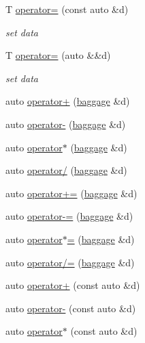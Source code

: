 \begin{DoxyCompactItemize}
T \hyperlink{classfractal_1_1baggage_aa196967bae7105ee4f7b2609557e3843}{operator=} (const auto \&d)
\begin{DoxyCompactList}\small\item\em set data \end{DoxyCompactList}\item 
T \hyperlink{classfractal_1_1baggage_a8904eb0c82e97fd1be2be7dbf9edf8a8}{operator=} (auto \&\&d)
\begin{DoxyCompactList}\small\item\em set data \end{DoxyCompactList}\item 
auto \hyperlink{classfractal_1_1baggage_a7e5735728eece548c425b12e45bb76ed}{operator+} (\hyperlink{classfractal_1_1baggage}{baggage} \&d)
\item 
auto \hyperlink{classfractal_1_1baggage_ae3e696df0f617540a076c098387c6df6}{operator-\/} (\hyperlink{classfractal_1_1baggage}{baggage} \&d)
\item 
auto \hyperlink{classfractal_1_1baggage_a65ff2c9d0b95c75913145564c916bb4e}{operator$\ast$} (\hyperlink{classfractal_1_1baggage}{baggage} \&d)
\item 
auto \hyperlink{classfractal_1_1baggage_a0011426532f94259bb3a737c26e4f9a8}{operator/} (\hyperlink{classfractal_1_1baggage}{baggage} \&d)
\item 
auto \hyperlink{classfractal_1_1baggage_a8a9085951c8eb400af15d2a9fd34e525}{operator+=} (\hyperlink{classfractal_1_1baggage}{baggage} \&d)
\item 
auto \hyperlink{classfractal_1_1baggage_a69180e126eca3a52976bf92dcf5fb998}{operator-\/=} (\hyperlink{classfractal_1_1baggage}{baggage} \&d)
\item 
auto \hyperlink{classfractal_1_1baggage_a4e874f81a01e3a13293163e4908eddf1}{operator$\ast$=} (\hyperlink{classfractal_1_1baggage}{baggage} \&d)
\item 
auto \hyperlink{classfractal_1_1baggage_a65c98b0f925e0c31d0d843a95aea5ffa}{operator/=} (\hyperlink{classfractal_1_1baggage}{baggage} \&d)
\item 
auto \hyperlink{classfractal_1_1baggage_a7a577be2bbc5619052bb8756c20ddb34}{operator+} (const auto \&d)
\item 
auto \hyperlink{classfractal_1_1baggage_a1c9f2aefd269f9338292f6075a575deb}{operator-\/} (const auto \&d)
\item 
auto \hyperlink{classfractal_1_1baggage_ac202db9fa4879077994458ed3e91967c}{operator$\ast$} (const auto \&d)
\item 

\end{DoxyCompactItemize}
